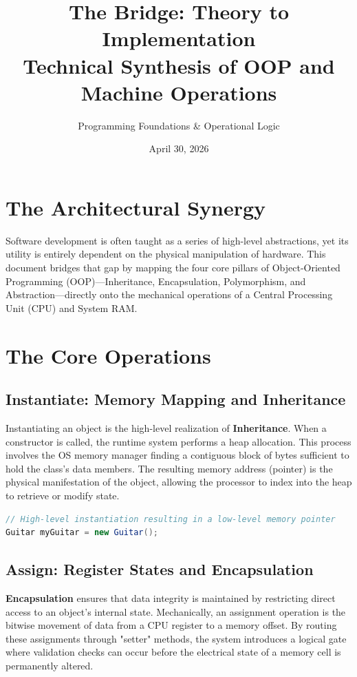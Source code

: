 \documentclass[12pt]{article}
\title{The Bridge: Theory to Implementation \\ \large Technical Synthesis of OOP and Machine Operations}
\author{Programming Foundations \& Operational Logic}
\date{April 30, 2026}
\begin{document}
\maketitle

\section{The Architectural Synergy}
Software development is often taught as a series of high-level abstractions, yet its utility is entirely dependent on the physical manipulation of hardware. This document bridges that gap by mapping the four core pillars of Object-Oriented Programming (OOP)---Inheritance, Encapsulation, Polymorphism, and Abstraction---directly onto the mechanical operations of a Central Processing Unit (CPU) and System RAM.

\section{The Core Operations}

\subsection{Instantiate: Memory Mapping and Inheritance}
Instantiating an object is the high-level realization of \textbf{Inheritance}. When a constructor is called, the runtime system performs a heap allocation. This process involves the OS memory manager finding a contiguous block of bytes sufficient to hold the class's data members. The resulting memory address (pointer) is the physical manifestation of the object, allowing the processor to index into the heap to retrieve or modify state.

\begin{lstlisting}[language=Java, caption=Heap Allocation Logic]
// High-level instantiation resulting in a low-level memory pointer
Guitar myGuitar = new Guitar(); 
\end{lstlisting}

\subsection{Assign: Register States and Encapsulation}
\textbf{Encapsulation} ensures that data integrity is maintained by restricting direct access to an object's internal state. Mechanically, an assignment operation is the bitwise movement of data from a CPU register to a memory offset. By routing these assignments through "setter" methods, the system introduces a logical gate where validation checks can occur before the electrical state of a memory cell is permanently altered.
\end{document}

